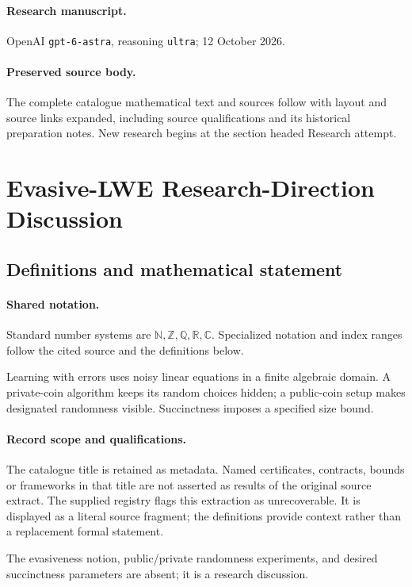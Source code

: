 \documentclass[11pt]{article}
\begin{document}
\paragraph{Research manuscript.} OpenAI \texttt{gpt-6-astra}, reasoning \texttt{ultra}; 12 October 2026.
\paragraph{Preserved source body.} The complete catalogue mathematical text and sources follow with layout and source links expanded, including source qualifications and its historical preparation notes. New research begins at the section headed Research attempt.

\section{Evasive-LWE Research-Direction Discussion}\label{statement}

\subsection{Definitions and mathematical statement}

\paragraph{Shared notation.}Standard number systems are $\mathbb N,\mathbb Z,\mathbb Q,\mathbb R,\mathbb C$. Specialized notation and index ranges follow the cited source and the definitions below.


Learning with errors uses noisy linear equations in a finite algebraic domain. A private-coin algorithm keeps its random choices hidden; a public-coin setup makes designated randomness visible. Succinctness imposes a specified size bound.
\paragraph{Record scope and qualifications.}
The catalogue title is retained as metadata. Named certificates, contracts, bounds or frameworks in that title are not asserted as results of the original source extract.
The supplied registry flags this extraction as unrecoverable. It is displayed as a literal source fragment; the definitions provide context rather than a replacement formal statement.

The evasiveness notion, public/private randomness experiments, and desired succinctness parameters are absent; it is a research discussion.
\end{document}
